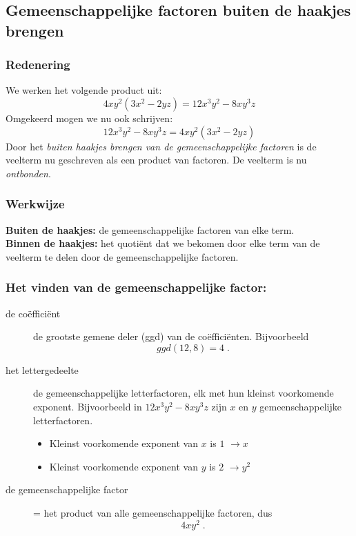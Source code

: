 \documentclass[12pt]{article}
\begin{document}
\subsection{Gemeenschappelijke factoren buiten de haakjes brengen}

\subsubsection{Redenering}
  We werken het volgende product uit:
$$4xy^2(3x^2 - 2yz) = 12x^3y^2 - 8xy^3z$$
Omgekeerd mogen we nu ook schrijven:
$$12x^3y^2 - 8xy^3z = 4xy^2(3x^2 - 2yz)$$
Door het {\em buiten haakjes brengen van de gemeenschappelijke factoren} is de veelterm nu geschreven als een product van factoren. De veelterm is nu {\em ontbonden}.

\subsubsection{Werkwijze}
  
{\bf Buiten de haakjes:} de gemeenschappelijke factoren van elke term.\\
{\bf Binnen de haakjes:} het quotiënt dat we bekomen door elke term van de veelterm te delen door de gemeenschappelijke factoren.

\subsubsection*{Het vinden van de gemeenschappelijke factor:}
\begin{description}
  \item[de coëfficiënt] de grootste gemene deler (ggd) van de coëfficiënten. Bijvoorbeeld
  $$ggd(12,8)=4\;.$$
  \item[het lettergedeelte] de gemeenschappelijke letterfactoren, elk met hun kleinst voorkomende exponent. Bijvoorbeeld in $12x^3y^2 - 8xy^3z$ zijn $x$ en $y$ gemeenschappelijke letterfactoren.
  \begin{itemize}
    \item Kleinst voorkomende exponent van $x$ is $1$ $\rightarrow x$
    \item Kleinst voorkomende exponent van $y$ is $2$ $\rightarrow y^2$
  \end{itemize}
  \item[de gemeenschappelijke factor] = het product van alle gemeenschappelijke factoren, dus
  $$4xy^2\;.$$
\end{description}
\end{document}
